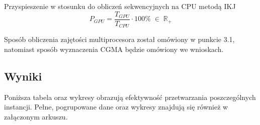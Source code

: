 \documentclass[12pt,a4paper]{article}
\begin{document}
\vspace{0.5cm}

Przyspieszenie w stosunku do obliczeń sekwencyjnych na CPU metodą IKJ
\begin{equation}
P_{GPU} = \frac{T_{GPU}}{T_{CPU}} \cdot 100\% \; \in \; \mathbb{R}_+
\end{equation}

\vspace{0.5cm}

Sposób obliczenia zajętości multiprocesora został omówiony w punkcie 3.1, natomiast sposób wyznaczenia CGMA będzie omówiony we wnioskach.

\subsection{Wyniki}

Poniższa tabela oraz wykresy obrazują efektywność przetwarzania poszczególnych instancji. Pełne, pogrupowane dane oraz wykresy znajdują się również w załączonym arkuszu.
\end{document}
